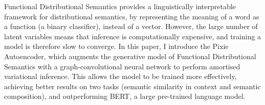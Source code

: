 Functional Distributional Semantics provides a linguistically interpretable framework for distributional semantics, by representing the meaning of a word as a function (a binary classifier), instead of a vector.  However, the large number of latent variables means that inference is computationally expensive, and training a model is therefore slow to converge.  In this paper, I introduce the Pixie Autoencoder, which augments the generative model of Functional Distributional Semantics with a graph-convolutional neural network to perform amortised variational inference.  This allows the model to be trained more effectively, achieving better results on two tasks (semantic similarity in context and semantic composition), and outperforming BERT, a large pre-trained language model.
